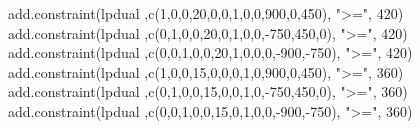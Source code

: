 \documentclass[
]{article}
\newenvironment{Shaded}{\begin{snugshade}}{\end{snugshade}}
\newcommand{\DecValTok}[1]{\textcolor[rgb]{0.00,0.00,0.81}{#1}}
\newcommand{\FunctionTok}[1]{\textcolor[rgb]{0.00,0.00,0.00}{#1}}
\newcommand{\NormalTok}[1]{#1}
\newcommand{\SpecialCharTok}[1]{\textcolor[rgb]{0.00,0.00,0.00}{#1}}
\newcommand{\StringTok}[1]{\textcolor[rgb]{0.31,0.60,0.02}{#1}}
\begin{document}
\begin{Shaded}
\begin{Highlighting}[]
\FunctionTok{add.constraint}\NormalTok{(lpdual ,}\FunctionTok{c}\NormalTok{(}\DecValTok{1}\NormalTok{,}\DecValTok{0}\NormalTok{,}\DecValTok{0}\NormalTok{,}\DecValTok{20}\NormalTok{,}\DecValTok{0}\NormalTok{,}\DecValTok{0}\NormalTok{,}\DecValTok{1}\NormalTok{,}\DecValTok{0}\NormalTok{,}\DecValTok{0}\NormalTok{,}\DecValTok{900}\NormalTok{,}\DecValTok{0}\NormalTok{,}\DecValTok{450}\NormalTok{), }\StringTok{"\textgreater{}="}\NormalTok{, }\DecValTok{420}\NormalTok{)}
\FunctionTok{add.constraint}\NormalTok{(lpdual ,}\FunctionTok{c}\NormalTok{(}\DecValTok{0}\NormalTok{,}\DecValTok{1}\NormalTok{,}\DecValTok{0}\NormalTok{,}\DecValTok{0}\NormalTok{,}\DecValTok{20}\NormalTok{,}\DecValTok{0}\NormalTok{,}\DecValTok{1}\NormalTok{,}\DecValTok{0}\NormalTok{,}\DecValTok{0}\NormalTok{,}\SpecialCharTok{{-}}\DecValTok{750}\NormalTok{,}\DecValTok{450}\NormalTok{,}\DecValTok{0}\NormalTok{), }\StringTok{"\textgreater{}="}\NormalTok{, }\DecValTok{420}\NormalTok{)}
\FunctionTok{add.constraint}\NormalTok{(lpdual ,}\FunctionTok{c}\NormalTok{(}\DecValTok{0}\NormalTok{,}\DecValTok{0}\NormalTok{,}\DecValTok{1}\NormalTok{,}\DecValTok{0}\NormalTok{,}\DecValTok{0}\NormalTok{,}\DecValTok{20}\NormalTok{,}\DecValTok{1}\NormalTok{,}\DecValTok{0}\NormalTok{,}\DecValTok{0}\NormalTok{,}\DecValTok{0}\NormalTok{,}\SpecialCharTok{{-}}\DecValTok{900}\NormalTok{,}\SpecialCharTok{{-}}\DecValTok{750}\NormalTok{), }\StringTok{"\textgreater{}="}\NormalTok{, }\DecValTok{420}\NormalTok{)}
\FunctionTok{add.constraint}\NormalTok{(lpdual ,}\FunctionTok{c}\NormalTok{(}\DecValTok{1}\NormalTok{,}\DecValTok{0}\NormalTok{,}\DecValTok{0}\NormalTok{,}\DecValTok{15}\NormalTok{,}\DecValTok{0}\NormalTok{,}\DecValTok{0}\NormalTok{,}\DecValTok{0}\NormalTok{,}\DecValTok{1}\NormalTok{,}\DecValTok{0}\NormalTok{,}\DecValTok{900}\NormalTok{,}\DecValTok{0}\NormalTok{,}\DecValTok{450}\NormalTok{), }\StringTok{"\textgreater{}="}\NormalTok{, }\DecValTok{360}\NormalTok{)}
\FunctionTok{add.constraint}\NormalTok{(lpdual ,}\FunctionTok{c}\NormalTok{(}\DecValTok{0}\NormalTok{,}\DecValTok{1}\NormalTok{,}\DecValTok{0}\NormalTok{,}\DecValTok{0}\NormalTok{,}\DecValTok{15}\NormalTok{,}\DecValTok{0}\NormalTok{,}\DecValTok{0}\NormalTok{,}\DecValTok{1}\NormalTok{,}\DecValTok{0}\NormalTok{,}\SpecialCharTok{{-}}\DecValTok{750}\NormalTok{,}\DecValTok{450}\NormalTok{,}\DecValTok{0}\NormalTok{), }\StringTok{"\textgreater{}="}\NormalTok{, }\DecValTok{360}\NormalTok{)}
\FunctionTok{add.constraint}\NormalTok{(lpdual ,}\FunctionTok{c}\NormalTok{(}\DecValTok{0}\NormalTok{,}\DecValTok{0}\NormalTok{,}\DecValTok{1}\NormalTok{,}\DecValTok{0}\NormalTok{,}\DecValTok{0}\NormalTok{,}\DecValTok{15}\NormalTok{,}\DecValTok{0}\NormalTok{,}\DecValTok{1}\NormalTok{,}\DecValTok{0}\NormalTok{,}\DecValTok{0}\NormalTok{,}\SpecialCharTok{{-}}\DecValTok{900}\NormalTok{,}\SpecialCharTok{{-}}\DecValTok{750}\NormalTok{), }\StringTok{"\textgreater{}="}\NormalTok{, }\DecValTok{360}\NormalTok{)}

\end{Highlighting}
\end{Shaded}
\end{document}
